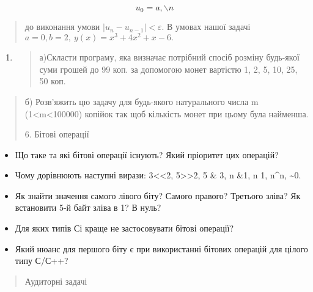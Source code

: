 \documentclass[]{article}
\begin{document}
\[u_{0} = a,\backslash n\]

\begin{quote}
до виконання умови \(\left| u_{n} - u_{n - 1} \right| < \varepsilon\). В
умовах нашої задачі \(a = 0,b = 2,\ y(x) = x^{3} + 4x^{2} + x - 6.\)
\end{quote}

\begin{enumerate}
\def\labelenumi{\arabic{enumi})}
\item
  \begin{quote}
  а)Скласти програму, яка визначає потрібний спосіб розміну будь-якої
  суми грошей до 99 коп. за допомогою монет вартістю 1, 2, 5, 10, 25, 50
  коп.
  \end{quote}
\end{enumerate}

\begin{quote}
б) Розв'яжить цю задачу для будь-якого натурального числа m
(1\textless{}m\textless{}100000) копійок так щоб кількість монет при
цьому була найменша.

6. Бітові операції
\end{quote}

\begin{itemize}
\item
  Що таке та які бітові операції існують? Який пріоритет цих операцій?
\item
  \protect\hypertarget{_Hlk65235798}{}{}Чому дорівнюють наступні вирази:
  3\textless{}\textless{}2, 5\textgreater{}\textgreater{}2, 5 \& 3, n
  \&1, n \textbar{} 1, n\^{}n, \textasciitilde{}0.
\item
  Як знайти значення самого лівого біту? Самого правого? Третього зліва?
  Як встановити 5-й байт зліва в 1? В нуль?
\item
  Для яких типів Сі краще не застосовувати бітові операції?
\item
  Який нюанс для першого біту є при використанні бітових операцій для
  цілого типу С/С++?
\end{itemize}

\begin{quote}
Аудиторні задачі
\end{quote}
\end{document}
